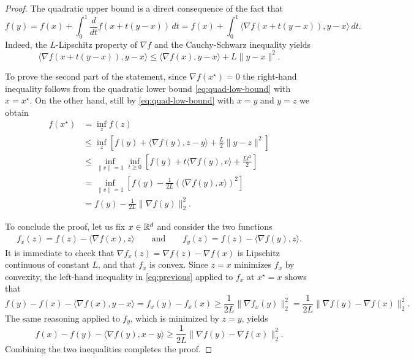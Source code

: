 \documentclass{report}
\begin{document}
\begin{proof}
	The quadratic upper bound is a direct consequence of the fact that 
	\begin{equation}
		f(y)
		=f(x)+\int_0^1 \frac{d}{dt} f(x+t(y-x)) \, dt
		=f(x)+\int_0^1 \langle\nabla f(x+t(y-x)), y-x \rangle\, dt.
	\end{equation}
	Indeed, the $L$-Lipschitz property of $\nabla f$ and the Cauchy-Schwarz inequality yields 
	\begin{equation}
		\langle\nabla f(x+t(y-x)), y-x \rangle 
		\le \langle\nabla f(x), y-x \rangle + L \|y-x\|^2.
	\end{equation}

	To prove the second part of the statement, since $\nabla f(x^\star) =0$ the right-hand inequality follows from the quadratic lower bound \eqref{eq:quad-low-bound} with $x=x^\star$. On the other hand, still by \eqref{eq:quad-low-bound} with $x=y$ and $y=z$ we obtain 
	\begin{equation}
		\begin{split}
			f(x^\star) 
			&= \inf_{z} f(z) \\
			&\le \inf_z \left[ f(y) + \langle \nabla f(y), z-y \rangle + \frac{L}2 \|y-z\|^2 \right]\\
			&\le \inf_{\|v\|=1} \inf_{t\ge 0} \left[ f(y) + t\langle \nabla f(y), v \rangle + \frac{Lt^2}2  \right]\\
			&= \inf_{\|v\|=1} \left[ f(y) - \frac{1}{2L} \left(\langle \nabla f(y),x\rangle\right)^2 \right]\\
			&= f(y) - \frac{1}{2L} \|\nabla f(y)\|_2^2.
		\end{split}
	\end{equation}

	To conclude the proof, let us fix $x\in \mathbb{R}^d$ and consider the two functions
	\begin{eqnarray}
		f_x(z) = f(z)-\langle \nabla f(x),z\rangle
		\qquad\text{and}\qquad
		f_y(z) = f(z)-\langle \nabla f(y),z\rangle.
	\end{eqnarray}
	It is immediate to check that $\nabla f_x(z) = \nabla f(z)-\nabla f(x)$ is Lipschitz continuous of constant $L$, and that $f_x$ is convex. 
	Since $z=x$ minimizes $f_x$ by convexity, the left-hand inequality in \eqref{eq:previous} applied to $f_x$ at $x^\star =x$ shows that 
	\begin{equation}
		f(y)-f(x)-\langle \nabla f(x),y-x \rangle = f_x(y)-f_x(x) \ge \frac{1}{2L}\|\nabla f_x(y)\|_2^2 = \frac{1}{2L}\|\nabla f(y)-\nabla f(x)\|_2^2.
	\end{equation} 
	The same reasoning applied to $f_y$, which is minimized by $z=y$, yields 
	\begin{equation}
		f(x)-f(y)-\langle \nabla f(y),x-y \rangle \ge \frac{1}{2L}\|\nabla f(y)-\nabla f(x)\|_2^2.
	\end{equation}
	Combining the two inequalities completes the proof.
\end{proof}
\end{document}
